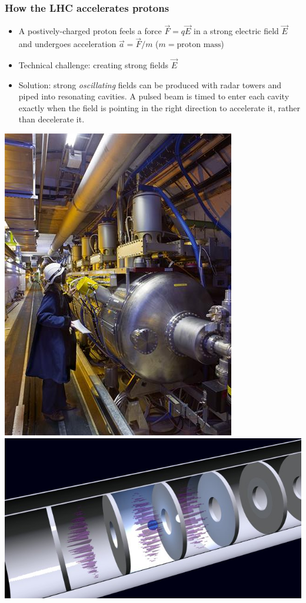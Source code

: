 \documentclass[compress]{beamer}
\begin{document}
\begin{frame}
\frametitle{How the LHC accelerates protons}

\begin{itemize}
\item A postively-charged proton feels a force $\vec{F} = q\vec{E}$ in
  a strong electric field $\vec{E}$ and undergoes acceleration
  $\vec{a} = \vec{F}/m$ ($m = \mbox{proton mass}$)

\item Technical challenge: creating strong fields $\vec{E}$

\item Solution: strong {\it oscillating} fields can be produced with
  radar towers and piped into resonating cavities.  A pulsed beam is timed to
  enter each cavity exactly when the field is pointing in the right
  direction to accelerate it, rather than decelerate it.
\end{itemize}

\includegraphics[height=4 cm]{lhc_rf_cavity.jpg} \hfill
\includegraphics[height=4 cm]{rf_cavity.jpg}
\end{frame}
\end{document}
